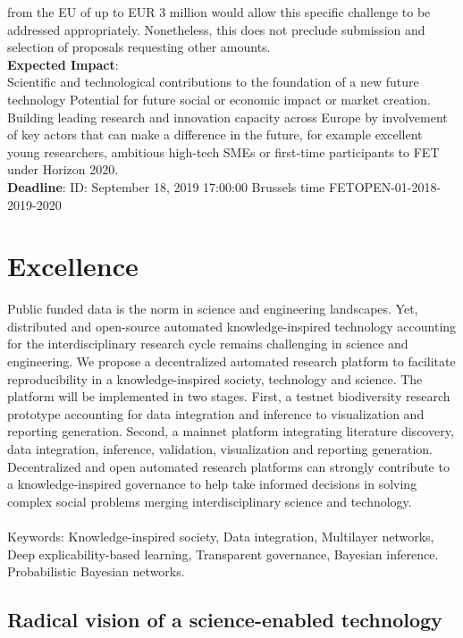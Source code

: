 \documentclass[english,12pt]{article}
\begin{document}
\begin{mybox}
\begin{singlespace}
\begin{small}
   from the EU of up to EUR 3 million would allow this specific
   challenge to be addressed appropriately. Nonetheless, this does not
   preclude submission and selection of proposals requesting other
   amounts.
 \\
   {\bf Expected Impact}: \\
   Scientific and technological contributions to the foundation of a
   new future technology Potential for future social or economic
   impact or market creation.  Building leading research and
   innovation capacity across Europe by involvement of key actors that
   can make a difference in the future, for example excellent young
   researchers, ambitious high-tech SMEs or first-time participants to
   FET under Horizon 2020.
   \\
   {\bf Deadline}: ID: September 18, 2019 17:00:00 Brussels time
   FETOPEN-01-2018-2019-2020
\end{small}
\end{singlespace}
\end{mybox}

\newpage

\section{Excellence}
Public funded data is the norm in science and engineering
landscapes. Yet, distributed and open-source automated
knowledge-inspired technology accounting for the interdisciplinary
research cycle remains challenging in science and engineering. We
propose a decentralized automated research platform to facilitate
reproducibility in a knowledge-inspired society, technology and
science. The platform will be implemented in two stages. First, a
testnet biodiversity research prototype accounting for data
integration and inference to visualization and reporting
generation. Second, a mainnet platform integrating literature
discovery, data integration, inference, validation, visualization and
reporting generation. Decentralized and open automated research
platforms can strongly contribute to a knowledge-inspired governance
to help take informed decisions in solving complex social problems
merging interdisciplinary science and technology.
\\
\\
Keywords: Knowledge-inspired society, Data integration, Multilayer
networks, Deep explicability-based learning, Transparent governance,
Bayesian inference. Probabilistic Bayesian networks.
\newpage

\subsection{Radical vision of a science-enabled technology}
\end{document}
